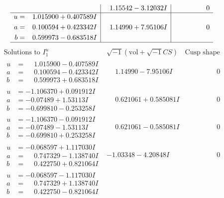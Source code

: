 \documentclass[1p]{elsarticle_modified}
\theoremstyle{definition}
\newcommand{\I}{\sqrt{-1}}
\begin{document}
$$\begin{array}{c|c|c}
 & \phantom{-}1.15542 - 3.12032 I & \phantom{-0.000000 } 0 \\ \hline\begin{aligned}
u &= \phantom{-}1.015900 + 0.407589 I \\
a &= \phantom{-}0.100594 + 0.423342 I \\
b &= \phantom{-}0.599973 - 0.683518 I\end{aligned}
 & \phantom{-}1.14990 + 7.95106 I & \phantom{-0.000000 } 0\\
 \hline 
 \end{array}$$\newpage$$\begin{array}{c|c|c}  
\text{Solutions to }I^u_{1}& \I (\text{vol} + \sqrt{-1}CS) & \text{Cusp shape}\\
 \hline 
\begin{aligned}
u &= \phantom{-}1.015900 - 0.407589 I \\
a &= \phantom{-}0.100594 - 0.423342 I \\
b &= \phantom{-}0.599973 + 0.683518 I\end{aligned}
 & \phantom{-}1.14990 - 7.95106 I & \phantom{-0.000000 } 0 \\ \hline\begin{aligned}
u &= -1.106370 + 0.091912 I \\
a &= -0.07489 + 1.53113 I \\
b &= -0.699810 - 0.253258 I\end{aligned}
 & \phantom{-}0.621061 + 0.585081 I & \phantom{-0.000000 } 0 \\ \hline\begin{aligned}
u &= -1.106370 - 0.091912 I \\
a &= -0.07489 - 1.53113 I \\
b &= -0.699810 + 0.253258 I\end{aligned}
 & \phantom{-}0.621061 - 0.585081 I & \phantom{-0.000000 } 0 \\ \hline\begin{aligned}
u &= -0.068597 + 1.117030 I \\
a &= \phantom{-}0.747329 - 1.138740 I \\
b &= \phantom{-}0.422750 + 0.821064 I\end{aligned}
 & -1.03348 - 4.20848 I & \phantom{-0.000000 } 0 \\ \hline\begin{aligned}
u &= -0.068597 - 1.117030 I \\
a &= \phantom{-}0.747329 + 1.138740 I \\
b &= \phantom{-}0.422750 - 0.821064 I\end{aligned}

\end{array}$$
\end{document}
